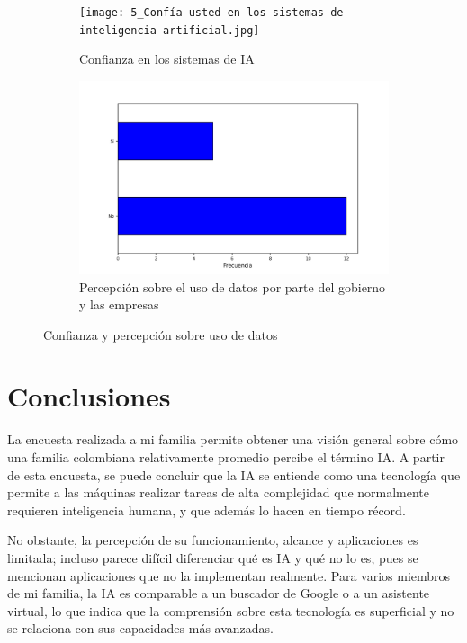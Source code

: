\documentclass[12pt,a4paper]{article}
\begin{document}
\begin{figure}[h!]
    \centering
    \begin{subfigure}{0.45\linewidth}
        \centering
        \texttt{[image: 5\_Confía usted en los sistemas de inteligencia artificial.jpg]}
        \caption{Confianza en los sistemas de IA}
        \label{fig:f5}
    \end{subfigure}
    \hfill
    \begin{subfigure}{0.45\linewidth}
        \centering
        \includegraphics[width=\linewidth]{10_Cree que el gobierno o las empresas están utilizando los datos eficazmente para mejorar estas áreas.jpg}
        \caption{Percepción sobre el uso de datos por parte del gobierno y las empresas}
        \label{fig:f6}
    \end{subfigure}
    \caption{Confianza y percepción sobre uso de datos}
\end{figure}

\section*{Conclusiones}
La encuesta realizada a mi familia permite obtener una visión general sobre cómo una familia colombiana
relativamente promedio percibe el término IA. A partir de esta encuesta, se puede concluir que la IA se entiende como 
una tecnología que permite a las máquinas realizar tareas de alta complejidad que normalmente requieren inteligencia humana,
y que además lo hacen en tiempo récord. 

No obstante, la percepción de su funcionamiento, alcance y aplicaciones es limitada; incluso parece difícil 
diferenciar qué es IA y qué no lo es, pues se mencionan aplicaciones que no la implementan realmente. 
Para varios miembros de mi familia, la IA es comparable a un buscador de Google o a un asistente virtual, 
lo que indica que la comprensión sobre esta tecnología es superficial y no se relaciona con sus capacidades más avanzadas.
\end{document}
